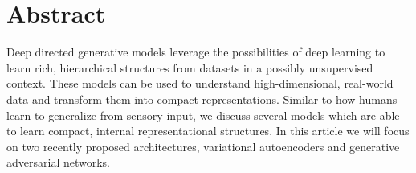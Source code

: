 \section{Abstract}
\label{sec:abstract}

Deep directed generative models leverage the possibilities of deep learning to learn rich, hierarchical structures from datasets in a possibly unsupervised context.
These models can be used to understand high-dimensional, real-world data and transform them into compact representations. Similar to how humans learn to generalize from sensory input, we discuss several models which are able to learn compact, internal representational structures.
In this article we will focus on two recently proposed architectures, variational autoencoders and generative adversarial networks.






